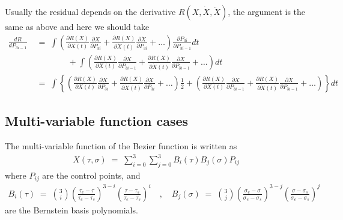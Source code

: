 \documentclass[12pt]{article}
\begin{document}
Usually the residual depends on the derivative $R(X,\dot{X},\ddot{X})$, the argument is the same as above and here we should take 
%
\begin{align*}
	\frac{d R}{d P_{3i-1}} & \;=\; \int \left( \frac{\partial R(X)}{\partial X(t)} \frac{\partial X}{\partial P_{3i}} + \frac{\partial R(X)}{\partial \dot{X}(t)} \frac{\partial \dot{X}}{\partial P_{3i}} + \dots \right)\frac{\partial P_{3i}}{\partial P_{3i-1}} dt \\
	& \qquad \qquad + \int \left( \frac{\partial R(X)}{\partial X(t)} \frac{\partial X}{\partial P_{3i-1}} + \frac{\partial R(X)}{\partial \dot{X}(t)} \frac{\partial \dot{X}}{\partial P_{3i-1}} + \dots \right) dt \\
	& \;=\; \int \left\{ \left( \frac{\partial R(X)}{\partial X(t)} \frac{\partial X}{\partial P_{3i}} + \frac{\partial R(X)}{\partial \dot{X}(t)} \frac{\partial \dot{X}}{\partial P_{3i}} + \dots \right)\frac{1}{2} + \left( \frac{\partial R(X)}{\partial X(t)} \frac{\partial X}{\partial P_{3i-1}} + \frac{\partial R(X)}{\partial \dot{X}(t)} \frac{\partial \dot{X}}{\partial P_{3i-1}} + \dots \right) \right\} dt
\end{align*}





\subsection{Multi-variable function cases}


The multi-variable function of the Bezier function is written as
%
\begin{align}
	X(\tau,\sigma) \;=\; \sum_{i=0}^3 \sum_{j=0}^3 B_i(\tau) B_j(\sigma) P_{ij}
\end{align}
%
where $P_{ij}$ are the control points, and
%
\begin{align*}
	B_i(\tau) \;=\; \binom{3}{i} \left( \frac{\tau_e - \tau}{\tau_e - \tau_s} \right)^{3-i} \left( \frac{\tau - \tau_s}{\tau_e - \tau_s} \right)^{i} \quad,\quad B_j(\sigma) \;=\; \binom{3}{j} \left( \frac{\sigma_e - \sigma}{\sigma_e - \sigma_s} \right)^{3-j} \left( \frac{\sigma - \sigma_s}{\sigma_e - \sigma_s} \right)^{j}
\end{align*}
%
are the Bernstein basis polynomials.
\end{document}
